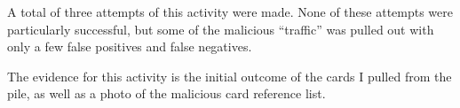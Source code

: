 A total of three attempts of this activity were made. None of these
attempts were particularly successful, but some of the malicious
``traffic'' was pulled out with only a few false positives and false
negatives.

The evidence for this activity is the initial outcome of the cards I
pulled from the pile, as well as a photo of the malicious card reference
list.
